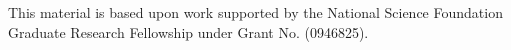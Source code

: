 This material is based upon work supported by the National Science Foundation Graduate Research Fellowship under Grant No. (0946825).

